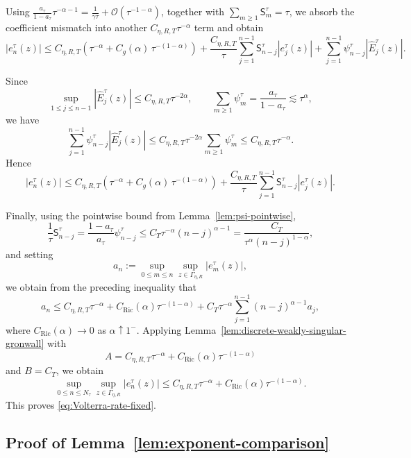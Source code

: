 \documentclass[letterpaper]{article}
\numberwithin{equation}{section}
\theoremstyle{definition}
\theoremstyle{remark}
\begin{document}
Using
$\frac{a_\tau}{1-a_\tau}\tau^{-\alpha-1}
  =
  \frac{1}{\gamma\tau}
  +\mathcal O(\tau^{-1-\alpha})$,
together with
$\sum_{m\ge1}\mathsf{S}_m^\tau=\tau$,
we absorb the coefficient mismatch into another $C_{\eta,R,T}\tau^{-\alpha}$
term and obtain
\[
  |e_n^\tau(z)|
  \le
  C_{\eta,R,T}
  \left(\tau^{-\alpha}+{C_g(\alpha)}\,\tau^{-(1-\alpha)}\right)
  +
  \frac{C_{\eta,R,T}}{\tau}
  \sum_{j=1}^{n-1}\mathsf{S}_{n-j}^\tau |e_j^\tau(z)|
  +
  \sum_{j=1}^{n-1}\psi_{n-j}^\tau |\widehat E_j^\tau(z)|.
\]

Since
\[
  \sup_{1\leq j\leq n-1} |\widehat E_j^\tau(z)|\le C_{\eta,R,T}\tau^{-2\alpha},
  \qquad
  \sum_{m\ge1}\psi_m^\tau=\frac{a_\tau}{1-a_\tau}\lesssim \tau^\alpha,
\]
we have
\[
  \sum_{j=1}^{n-1}\psi_{n-j}^\tau |\widehat E_j^\tau(z)|
  \le
  C_{\eta,R,T}\tau^{-2\alpha}\sum_{m\ge1}\psi_m^\tau
  \le
  C_{\eta,R,T}\tau^{-\alpha}.
\]
Hence
\[
  |e_n^\tau(z)|
  \le
  C_{\eta,R,T}
  \left(\tau^{-\alpha}+{C_g(\alpha)}\,\tau^{-(1-\alpha)}\right)
  +
  \frac{C_{\eta,R,T}}{\tau}
  \sum_{j=1}^{n-1}\mathsf{S}_{n-j}^\tau |e_j^\tau(z)|.
\]

Finally, using the pointwise bound from Lemma~\ref{lem:psi-pointwise},
\[
  \frac{1}{\tau}\mathsf{S}_{n-j}^\tau
  =
  \frac{1-a_\tau}{a_\tau}\psi_{n-j}^\tau
  \le
  C_T\tau^{-\alpha}(n-j)^{\alpha-1}
  =
  \frac{C_T}{\tau^\alpha (n-j)^{1-\alpha}},
\]
and setting
\[
  a_n:=\sup_{0\le m\le n}\sup_{z\in\Gamma_{\eta,R}}|e_m^\tau(z)|,
\]
we obtain from the preceding inequality that
\[
  a_n
  \le
  C_{\eta,R,T}\tau^{-\alpha}
  +
  C_{\mathrm{Ric}}(\alpha)\tau^{-(1-\alpha)}
  +
  C_T\tau^{-\alpha}\sum_{j=1}^{n-1}(n-j)^{\alpha-1}a_j,
\]
where
$C_{\mathrm{Ric}}(\alpha)\to0$
as $\alpha\uparrow1^-$.
Applying Lemma~\ref{lem:discrete-weakly-singular-gronwall} with
\[
  A=C_{\eta,R,T}\tau^{-\alpha}
  +
  C_{\mathrm{Ric}}(\alpha)\tau^{-(1-\alpha)}
\]
and $B=C_T$, we obtain
\[
  \sup_{0\le n\le N_\tau}\sup_{z\in\Gamma_{\eta,R}}|e_n^\tau(z)|
  \le
  C_{\eta,R,T}\tau^{-\alpha}
  +
  C_{\mathrm{Ric}}(\alpha)\tau^{-(1-\alpha)}.
\]
This proves \eqref{eq:Volterra-rate-fixed}.

\subsection{Proof of Lemma~\ref{lem:exponent-comparison}}\label{app:proof-exponent-comparison}
\end{document}
